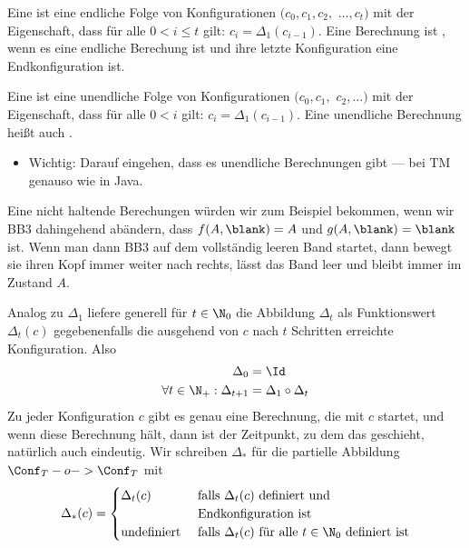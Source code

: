 Eine  ist eine endliche Folge von
Konfigurationen $(c_0, c_1, c_2,$ $\dots, c_t)$ mit der Eigenschaft,
dass für alle $0<i\leq t$ gilt: $c_i = \Delta_1(c_{i-1})$.  Eine
Berechnung ist %
, wenn es eine endliche Berechung ist und ihre letzte
Konfiguration eine Endkonfiguration ist.

Eine  ist eine unendliche Folge
von Konfigurationen $(c_0, c_1,$ $c_2, \dots)$ mit der Eigenschaft,
dass für alle $0<i$ gilt: $c_i = \Delta_1(c_{i-1})$. Eine unendliche
Berechnung heißt auch .

\begin{tutorium}
  \begin{itemize}
  \item Wichtig: Darauf eingehen, dass es unendliche Berechnungen
    gibt --- bei TM genauso wie in Java.
  \end{itemize}
\end{tutorium}

Eine nicht haltende Berechungen würden wir zum Beispiel bekommen, wenn
wir BB3 dahingehend abändern, dass $f(A,\blank)=A$ und
$g(A,\blank)=\blank$ ist. Wenn man dann BB3 auf dem vollständig leeren
Band startet, dann bewegt sie ihren Kopf immer weiter nach rechts,
lässt das Band leer und bleibt immer im Zustand $A$.

Analog zu $\Delta_1$ liefere generell für $t\in
\N_0$ die Abbildung $\Delta_t$ als Funktionswert $\Delta_t(c)$
gegebenenfalls die ausgehend von $c$ nach $t$ Schritten erreichte
Konfiguration. Also
\begin{align*}
  \Delta_0 &= \Id \\
\forall t\in \N_+:  \Delta_{t+1} &= \Delta_1 \circ \Delta_t 
\end{align*}
%
Zu jeder Konfiguration $c$ gibt es genau eine Berechnung, die mit $c$
startet, und wenn diese Berechnung hält, dann ist der Zeitpunkt, zu dem
das geschieht, natürlich auch eindeutig. Wir schreiben $\Delta_*$ für
die partielle Abbildung $\Conf_T -o-> \Conf_T$ mit
\[
\Delta_*(c) =
\begin{cases}
  \Delta_t(c) & \text{ falls $\Delta_t(c)$ definiert und }\\
  & \text{ Endkonfiguration ist} \\
  \text{undefiniert} & \text{ falls $\Delta_t(c)$ für alle $t\in \N_0$ definiert ist} \\
\end{cases}
\]

